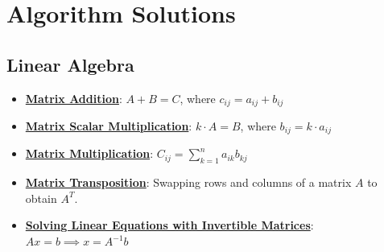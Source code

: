 \documentclass{article}%
\begin{document}
%
\section{Algorithm Solutions}%
\label{sec:AlgorithmSolutions}%
\subsection{Linear Algebra}%
\label{subsec:LinearAlgebra}%
\begin{itemize}[leftmargin=*]%
\item \href{\url{https://purdue.brightspace.com/d2l/common/assets/pdfjs-d2l-dist/1.0.14-legacy/web/viewer.html?file=\%252Fcontent\%252Fenforced\%252F1095467-wl.202510.CS.24300.001\%252F04L1-Linear\%20Algebra\%20Primer.pdf\%253Fou\%253D1095467\&lang=en-us\&container=d2l-fileviewer-rendered-pdf\&fullscreen=d2l-fileviewer-rendered-pdf-dialog\&height=667}#page=9}{\textbf{Matrix Addition}}: $A + B = C$, where $c_{ij} = a_{ij} + b_{ij}$%
\item \href{\url{https://purdue.brightspace.com/d2l/common/assets/pdfjs-d2l-dist/1.0.14-legacy/web/viewer.html?file=\%252Fcontent\%252Fenforced\%252F1095467-wl.202510.CS.24300.001\%252F04L1-Linear\%20Algebra\%20Primer.pdf\%253Fou\%253D1095467\&lang=en-us\&container=d2l-fileviewer-rendered-pdf\&fullscreen=d2l-fileviewer-rendered-pdf-dialog\&height=667}#page=9}{\textbf{Matrix Scalar Multiplication}}: $k \cdot A = B$, where $b_{ij} = k \cdot a_{ij}$%
\item \href{\url{https://purdue.brightspace.com/d2l/common/assets/pdfjs-d2l-dist/1.0.14-legacy/web/viewer.html?file=\%252Fcontent\%252Fenforced\%252F1095467-wl.202510.CS.24300.001\%252F04L1-Linear\%20Algebra\%20Primer.pdf\%253Fou\%253D1095467\&lang=en-us\&container=d2l-fileviewer-rendered-pdf\&fullscreen=d2l-fileviewer-rendered-pdf-dialog\&height=667}#page=14}{\textbf{Matrix Multiplication}}: $C_{ij} = \sum_{k=1}^{n} a_{ik}b_{kj}$%
\item \href{\url{https://purdue.brightspace.com/d2l/common/assets/pdfjs-d2l-dist/1.0.14-legacy/web/viewer.html?file=\%252Fcontent\%252Fenforced\%252F1095467-wl.202510.CS.24300.001\%252F04L1-Linear\%20Algebra\%20Primer.pdf\%253Fou\%253D1095467\&lang=en-us\&container=d2l-fileviewer-rendered-pdf\&fullscreen=d2l-fileviewer-rendered-pdf-dialog\&height=667}#page=16}{\textbf{Matrix Transposition}}: Swapping rows and columns of a matrix $A$ to obtain $A^T$.%
\item \href{\url{https://purdue.brightspace.com/d2l/common/assets/pdfjs-d2l-dist/1.0.14-legacy/web/viewer.html?file=\%252Fcontent\%252Fenforced\%252F1095467-wl.202510.CS.24300.001\%252F04L1-Linear\%20Algebra\%20Primer.pdf\%253Fou\%253D1095467\&lang=en-us\&container=d2l-fileviewer-rendered-pdf\&fullscreen=d2l-fileviewer-rendered-pdf-dialog\&height=667}#page=12}{\textbf{Solving Linear Equations with Invertible Matrices}}: $Ax = b \implies x = A^{-1}b$%

\end{itemize}
\end{document}
